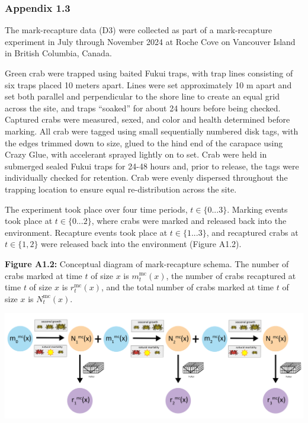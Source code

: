 \documentclass[
]{article}
\begin{document}
\subsubsection{Appendix 1.3}\label{appendix-1.3}

The mark-recapture data (D3) were collected as part of a mark-recapture
experiment in July through November 2024 at Roche Cove on Vancouver
Island in British Columbia, Canada.

Green crab were trapped using baited Fukui traps, with trap lines
consisting of six traps placed 10 meters apart. Lines were set
approximately 10 m apart and set both parallel and perpendicular to the
shore line to create an equal grid across the site, and traps ``soaked''
for about 24 hours before being checked. Captured crabs were measured,
sexed, and color and health determined before marking. All crab were
tagged using small sequentially numbered disk tags, with the edges
trimmed down to size, glued to the hind end of the carapace using Crazy
Glue, with accelerant sprayed lightly on to set. Crab were held in
submerged sealed Fukui traps for 24-48 hours and, prior to release, the
tags were individually checked for retention. Crab were evenly dispersed
throughout the trapping location to ensure equal re-distribution across
the site.

The experiment took place over four time periods, \(t \in \{0 ... 3\}\).
Marking events took place at \(t \in \{0 ... 2\}\), where crabs were
marked and released back into the environment. Recapture events took
place at \(t \in \{1 ... 3\}\), and recaptured crabs at
\(t \in \{1,  2\}\) were released back into the environment (Figure
A1.2).

\textbf{Figure A1.2:} Conceptual diagram of mark-recapture schema. The
number of crabs marked at time \(t\) of size \(x\) is
\(m^{\text{mc}}_t(x)\), the number of crabs recaptured at time \(t\) of
size \(x\) is \(r^{\text{mc}}_t(x)\), and the total number of crabs
marked at time \(t\) of size \(x\) is \(N^{\text{mc}}_t(x)\).

\includegraphics[width=136.25in]{../figures/appendix_mark_recapture_conceptual-01}
\end{document}
